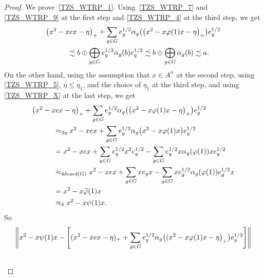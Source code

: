 \documentclass[11pt]{amsart}
\theoremstyle{plain}
\theoremstyle{definition}
\theoremstyle{remark}
\numberwithin{equation}{section}
\newcommand{\card}{{\operatorname{card}}}
\begin{document}
\begin{proof}
We prove~\ref{TZS_WTRP_1}.
Using~\eqref{TZS_WTRP_7} and \eqref{TZS_WTRP_9}
at the first step
and \eqref{TZS_WTRP_4} at the third step, we get
%
\begin{align}\label{lem_fg_eq1}
& \big( x^{2} - x e x - \eta \big)_{+}
  + \sum_{g \in G} e_{g}^{1/2}
      \alpha_{g}
          \big( \big( x^{2} - x \varphi (1) x - \eta \big)_{+} \big)
         e_{g}^{1/2}
\\
& \hspace*{3em} {\mbox{}}
   \precsim b \oplus \bigoplus_{g \in G}
              e_{g}^{1/2} \alpha_g (b) e_{g}^{1/2}
   \precsim b \oplus \bigoplus_{g \in G} \alpha_{g} (b)
   \precsim a.
\notag
\end{align}
%
On the other hand,
using the assumption that $x \in A^{\alpha}$ at the second step,
using \eqref{TZS_WTRP_5}, $\eta \leq \eta_1$,
and the choice of $\eta_1$ at the third step,
and using \eqref{TZS_WTRP_X} at the last step,
we get
%
\begin{align*}
& \big( x^{2} - x e x - \eta \big)_{+}
    + \sum_{g \in G} e_{g}^{1/2} \alpha_{g}
         \big( \big( x^{2} - x \varphi (1) x - \eta \big)_{+} \big)
      e_{g}^{1/2}
\\
& \hspace*{3em} {\mbox{}}
 \approx_{2 \eta} x^{2} - x e x + \sum_{g \in G} e_{g}^{1/2}
\alpha_{g} \big( x^{2} - x \varphi (1) x \big) e_{g}^{1/2}
\\
& \hspace*{3em} {\mbox{}}
 = x^{2} - x e x + \sum_{g \in G} e_{g}^{1/2} x^{2} e_{g}^{1/2}
    - \sum_{g \in G}
       e_{g}^{1/2} x \alpha_{g} (\varphi (1)) x e_{g}^{1/2}
\\
& \hspace*{3em} {\mbox{}}
 \approx_{4 \delta \card (G)} x^{2} - x e x + \sum_{g \in G} x e_{g} x
  - \sum_{g \in G} x e_{g}^{1/2} \alpha_{g} (\varphi (1)) e_{g}^{1/2} x
\\
& \hspace*{3em} {\mbox{}}
 = x^{2} - x \widetilde{\varphi} (1) x
\\
& \hspace*{3em} {\mbox{}}
 \approx_{\delta} x^{2} - x {\psi} (1) x.
\end{align*}
%
So
%
\begin{align*}
&
\Bigg\| x^{2} - x \psi (1) x
 - \Bigg[ (x^{2} - x e x - \eta)_{+} +
     \sum_{g \in G} e_{g}^{1/2}
        \alpha_{g} \big( (x^{2} - x \varphi (1) x - \eta \big)_{+} \big)
             e_{g}^{1/2} \Bigg] \Bigg\|
\\
& \hspace*{3em} {\mbox{}}

\end{align*}
\end{proof}
\end{document}
